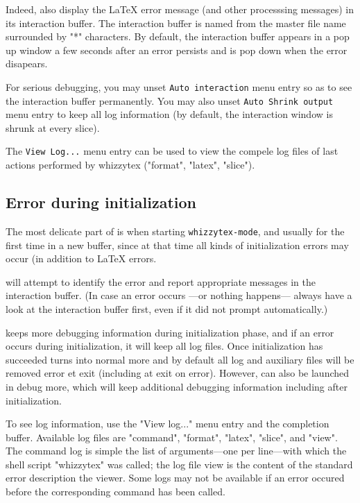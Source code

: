 \documentclass[12pt]{article}
\begin{document}
Indeed, {\whizzy} also display the {\LaTeX} error message
(and other processsing messages) in its interaction buffer.
The interaction buffer is named from the master file name surrounded
by \lst"*" characters. By default, the interaction buffer appears
in a pop up window a few seconds after an error persists and is pop down
when the error disapears. 

For serious debugging, you may unset {\tt Auto interaction} menu entry so as
to see the interaction buffer permanently. You may also unset {\tt Auto
Shrink output} menu entry to keep all log information (by default, the
interaction window is shrunk at every slice).

The {\tt View Log...} menu entry can be used to view the compele log files of
last actions performed by whizzytex (\lst"format", \lst"latex",
\lst"slice"). 

\subsection {Error during initialization}

The most delicate part of {\whizzy} is when starting {\tt whizzytex-mode},
and usually for the first time in a new buffer, since at that time all kinds
of initialization errors may occur (in addition to {\LaTeX} errors. 

{\whizzy} will attempt to identify the error and report appropriate messages
in the interaction buffer. (In case an error occurs ---or nothing happens---
always have a look at the interaction buffer first, even if it did not
prompt automatically.)

{\whizzy} keeps more debugging information during initialization phase, 
and if an error occurs during initialization, it will keep all log files.
Once initialization has succeeded  {\whizzy} turns into normal more and
by default all log and auxiliary files will be removed error et exit
(including at exit on error). However, {\whizzy} can also be launched in
debug more, which will keep additional debugging information including 
after initialization. 

To see log information, use the \lst"View log..." menu entry 
and the completion buffer. Available log files are \lst"command", 
\lst"format", \lst"latex", \lst"slice", and \lst"view".
The command log is simple the list of arguments---one per line---with which
the shell script \lst"whizzytex" was called; the log file view is the
content of the standard error description the viewer.  Some logs may not be
available if an error occured before the corresponding command has been
called. 
\end{document}
